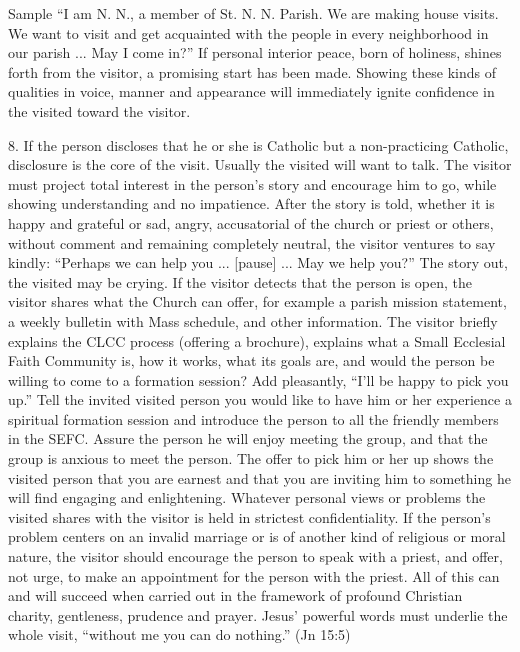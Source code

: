 \documentclass[oneside]{book}
\begin{document}
Sample
``I am N. N., a member of St. N. N. Parish. We are making house visits. We want to visit and
get acquainted with the people in every neighborhood in our parish ... May I
come in?''
If personal interior peace, born of holiness, shines forth from the visitor, a
promising start has been made. Showing these kinds of qualities in voice, manner
and appearance will immediately ignite confidence in the visited toward the
visitor.

8. If the person discloses that he or she is Catholic but a non-practicing
Catholic, disclosure is the core of the visit. Usually the visited will want to
talk. The visitor must project total interest in the person's story and
encourage him to go, while showing understanding and no impatience. After the
story is told, whether it is happy and grateful or sad, angry, accusatorial of
the church or priest or others, without comment and remaining completely
neutral, the visitor ventures to say kindly:
``Perhaps we can help you ... [pause] ... May we help you?''
The story out, the visited may be crying. If the visitor detects that the person
is open, the visitor shares what the Church can offer, for example a parish
mission statement, a weekly bulletin with Mass schedule, and other
information. The visitor briefly explains the CLCC process (offering a
brochure), explains what a Small Ecclesial Faith Community is, how it works,
what its goals are, and would the person be willing to come to a formation
session? Add pleasantly, ``I'll be happy to pick you up.'' Tell the invited
visited person you would like to have him or her experience a spiritual
formation session and introduce the person to all the friendly members in the
SEFC. Assure the person he will enjoy meeting the group, and that the group is
anxious to meet the person.
The offer to pick him or her up shows the visited person that you are earnest
and that you are inviting him to something he will find engaging and
enlightening. Whatever personal views or problems the visited shares with the
visitor is held in strictest confidentiality. If the person's problem centers on
an invalid marriage or is of another kind of religious or moral nature, the
visitor should encourage the person to speak with a priest, and offer, not urge,
to make an appointment for the person with the priest. All of this can and will
succeed when carried out in the framework of profound Christian charity,
gentleness, prudence and prayer. Jesus' powerful words must underlie the whole
visit, ``without me you can do nothing.'' (Jn 15:5)
\end{document}
